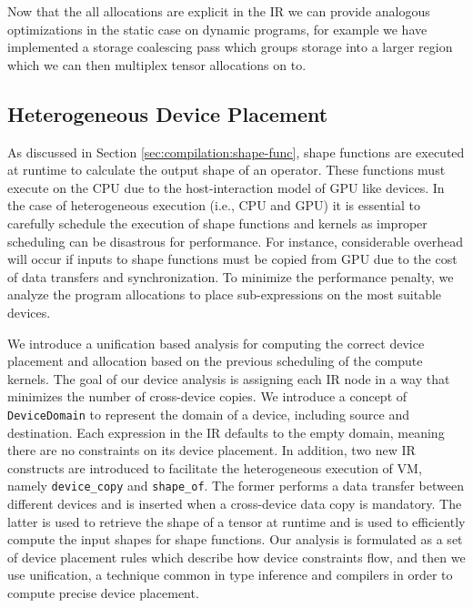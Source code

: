 Now that the all allocations are explicit in the IR we can provide analogous optimizations in the static
case on dynamic programs, for example we have implemented a storage coalescing pass which groups storage
into a larger region which we can then multiplex tensor allocations on to.


\subsection{Heterogeneous Device Placement}
\label{sec:compliation:hetero}
As discussed in Section \autoref{sec:compilation:shape-func}, shape functions are executed at runtime to calculate the output shape of an operator. These functions must execute on the CPU due to the host-interaction model of GPU like devices. In the case of heterogeneous execution (i.e., CPU and GPU) it is essential to carefully schedule the execution of shape functions and kernels as improper scheduling can be disastrous for performance. For instance, considerable overhead will occur if inputs to shape functions must be copied from GPU due to the cost of data transfers and synchronization. To minimize the performance penalty, we analyze the program allocations to place sub-expressions on the most suitable devices.

We introduce a unification based analysis for computing the correct device placement and allocation based on the previous scheduling of the compute kernels. The goal of our device analysis is assigning each IR node in a way that minimizes the number of cross-device copies. We introduce a concept of \texttt{DeviceDomain} to represent the domain of a device, including source and destination. Each expression in the IR defaults to the empty domain, meaning there are no constraints on its device placement. In addition, two new IR constructs are introduced to facilitate the heterogeneous execution of VM, namely \verb|device_copy| and \verb|shape_of|. The former performs a data transfer between different devices and is inserted when a cross-device data copy is mandatory. The latter is used to retrieve the shape of a tensor at runtime and is used to efficiently compute the input shapes for shape functions. Our analysis is formulated as a set of device placement rules which describe how device constraints flow, and then we use unification, a technique common in type inference and compilers in order to compute precise device placement.

